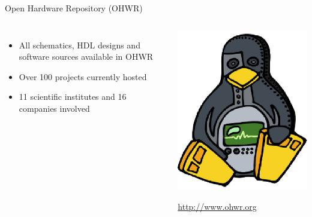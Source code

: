 \documentclass[compress,red]{beamer}
\begin{document}
\begin{frame}{Open Hardware Repository (OHWR)}
  \begin{columns}
    \begin{itemize}
      \item All schematics, HDL designs and software sources available in OHWR
      \item Over 100 projects currently hosted
      \item 11 scientific institutes and 16 companies involved
    \end{itemize}
    \begin{center}
      \includegraphics[width=\textwidth]{../../figures/ohwr/ohr_logo.eps}
      \begin{block}{}
        \begin{center}
        \url{http://www.ohwr.org}
        \end{center}
      \end{block}
    \end{center}
  \end{columns}
\end{frame}
\end{document}
